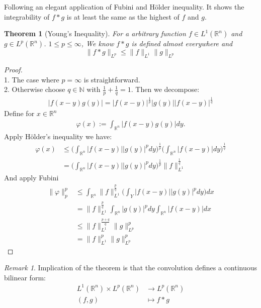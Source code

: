 \documentclass[a4paper,11pt,fleqn]{book}
\newtheorem{theorem}{Theorem}[section]
\theoremstyle{definition}
\theoremstyle{remark}
\newtheorem*{remark}{Remark}
\begin{document}
Following an elegant application of Fubini and H\"older inequality. It shows the integrability of $f*g$ is at least the same as the highest of $f$ and $g$. 
\begin{theorem}[Young's Inequality]
For a arbitrary function $f\in L^1(\mathbb{R}^n)$ and $g \in L^p(\mathbb{R}^n)$. $1 \leq p \leq \infty$, We know $f*g$ is defined almost everywhere and
	\begin{equation*}
		\|f * g\|_{L^p} \leq \|f\|_{L^1} \|g\|_{L^p}
	\end{equation*}
\end{theorem}
\begin{proof}\quad\\
	1. The case where $p = \infty$ is straightforward.\\ 
	2. Otherwise choose $q \in \mathbb{N}$ with $\frac{1}{p} + \frac{1}{q}= 1$. Then we decompose:
	\begin{align*}
		|f(x - y)g(y)| = |f(x-y)|^{\frac{1}{p}}|g(y)||f(x-y)|^{\frac{1}{q}}
	\end{align*} 
	Define for $x \in \mathbb{R}^n$
	\begin{align*}
		\varphi(x):= \int_{\mathbb{R}^n} |f(x - y) g(y)| dy. 
	\end{align*}
	Apply H\"older's inequality we have:
	\begin{align*}
		\varphi(x) 
		&\leq \bigg(\int_{\mathbb{R}^n} |f(x-y)||g(y)|^p dy\bigg)^{\frac{1}{p}} \bigg(\int_{\mathbb{R}^n} |f(x - y)| dy \bigg)^\frac{1}{q}\\
		&= \bigg(\int_{\mathbb{R}^n} |f(x-y)||g(y)|^p dy\bigg)^{\frac{1}{p}} \|f\|^{\frac{1}{q}}_{L^1}
	\end{align*}
	And apply Fubini
	\begin{align*}
		\|\varphi\|^p_p 
		&\leq \int_{\mathbb{R}^n} \|f\|^{\frac{p}{q}}_{L^1} \bigg(\int_Y |f(x-y)||g(y)|^p dy\bigg) dx\\
		&= \|f\|^\frac{p}{q}_{L^1} \int_{\mathbb{R}^n} |g(y)|^p dy \int_{\mathbb{R}^n} |f(x-y)|dx\\
		&\leq \|f\|^{\frac{p+q}{q}}_{L^1} \|g\|_{L^p}^p\\
		&= \|f\|^p_{L^1} \|g\|_{L^p}^p
	\end{align*}
\end{proof}
\begin{remark}
Implication of the theorem is that the convolution defines a continuous bilinear form:
\begin{align*}
	L^1(\mathbb{R}^n) \times L^p(\mathbb{R}^n) &\rightarrow L^p(\mathbb{R}^n)\\
	(f, g) &\mapsto f * g
\end{align*}	
\end{remark}
\end{document}
